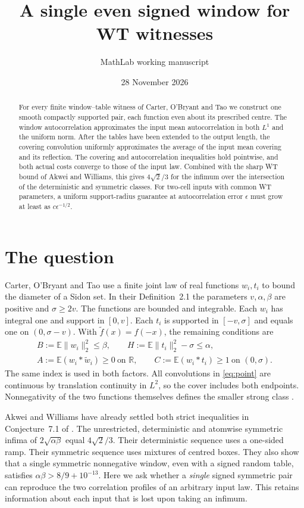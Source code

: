 \documentclass[11pt]{article}
\title{A single even signed window for WT witnesses}
\author{MathLab working manuscript}
\date{28 November 2026}
\newcommand{\R}{\mathbb R}
\newcommand{\E}{\mathbb E}
\newcommand{\norm}[1]{\lVert #1\rVert}
\begin{document}
\maketitle
\begin{abstract}
For every finite window--table witness of Carter, O'Bryant and Tao we construct one smooth compactly supported pair, each function even about its prescribed centre. The window autocorrelation approximates the input mean autocorrelation in both \(L^1\) and the uniform norm. After the tables have been extended to the output length, the covering convolution uniformly approximates the average of the input mean covering and its reflection. The covering and autocorrelation inequalities hold pointwise, and both actual costs converge to those of the input law. Combined with the sharp WT bound of Akwei and Williams, this gives \(4\sqrt2/3\) for the infimum over the intersection of the deterministic and symmetric classes. For two-cell inputs with common WT parameters, a uniform support-radius guarantee at autocorrelation error \(\epsilon\) must grow at least as \(c\epsilon^{-1/2}\).
\end{abstract}

\section{The question}
Carter, O'Bryant and Tao use a finite joint law of real functions \(w_i,t_i\) to bound the diameter of a Sidon set. In their Definition~2.1 the parameters \(v,\alpha,\beta\) are positive and \(\sigma\ge2v\). The functions are bounded and integrable. Each \(w_i\) has integral one and support in \([0,v]\). Each \(t_i\) is supported in \([-v,\sigma]\) and equals one on \((0,\sigma-v)\). With \(\widetilde f(x)=f(-x)\), the remaining conditions are
\begin{align}
 B:=\E\norm{w_i}_2^2\le\beta,\qquad
 H:=\E\norm{t_i}_2^2-\sigma\le\alpha, \label{eq:budget}\\
 A:=\E(w_i*\widetilde w_i)\ge0 \ \text{on }\R,\qquad
 C:=\E(w_i*t_i)\ge1 \ \text{on }(0,\sigma). \label{eq:point}
\end{align}
The same index is used in both factors. All convolutions in \eqref{eq:point} are continuous by translation continuity in \(L^2\), so the cover includes both endpoints. Nonnegativity of the two functions themselves defines the smaller strong class \cite{cot}.

Akwei and Williams \cite{aw} have already settled both strict inequalities in Conjecture~7.1 of \cite{cot}. The unrestricted, deterministic and atomwise symmetric infima of \(2\sqrt{\alpha\beta}\) equal \(4\sqrt2/3\). Their deterministic sequence uses a one-sided ramp. Their symmetric sequence uses mixtures of centred boxes. They also show that a single symmetric nonnegative window, even with a signed random table, satisfies \(\alpha\beta>8/9+10^{-13}\). Here we ask whether a \emph{single} signed symmetric pair can reproduce the two correlation profiles of an arbitrary input law. This retains information about each input that is lost upon taking an infimum.
\end{document}

